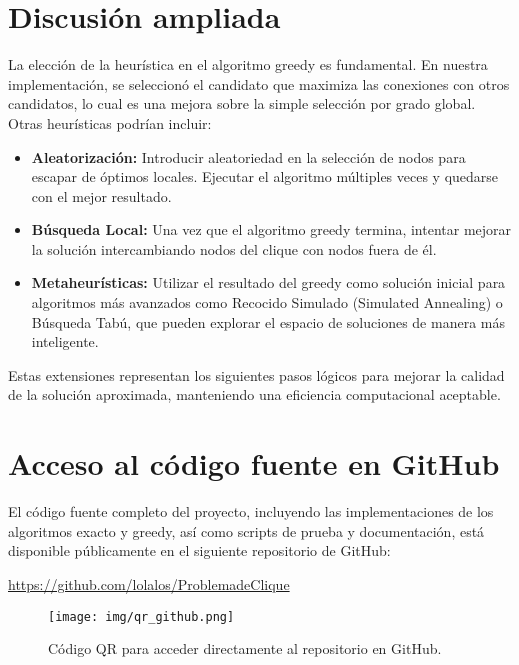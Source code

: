 \documentclass[12pt,a4paper]{report}
\begin{document}
\section{Discusión ampliada}
La elección de la heurística en el algoritmo greedy es fundamental. En nuestra implementación, se seleccionó el candidato que maximiza las conexiones con otros candidatos, lo cual es una mejora sobre la simple selección por grado global. Otras heurísticas podrían incluir:
\begin{itemize}
    \item \textbf{Aleatorización:} Introducir aleatoriedad en la selección de nodos para escapar de óptimos locales. Ejecutar el algoritmo múltiples veces y quedarse con el mejor resultado.
    \item \textbf{Búsqueda Local:} Una vez que el algoritmo greedy termina, intentar mejorar la solución intercambiando nodos del clique con nodos fuera de él.
    \item \textbf{Metaheurísticas:} Utilizar el resultado del greedy como solución inicial para algoritmos más avanzados como Recocido Simulado (Simulated Annealing) o Búsqueda Tabú, que pueden explorar el espacio de soluciones de manera más inteligente.
\end{itemize}
Estas extensiones representan los siguientes pasos lógicos para mejorar la calidad de la solución aproximada, manteniendo una eficiencia computacional aceptable.
\section{Acceso al código fuente en GitHub}

El código fuente completo del proyecto, incluyendo las implementaciones de los algoritmos exacto y greedy, así como scripts de prueba y documentación, está disponible públicamente en el siguiente repositorio de GitHub:

\begin{center}
\url{https://github.com/lolalos/ProblemadeClique}
\end{center}

\begin{figure}[H]
    \centering
    \texttt{[image: img/qr\_github.png]}
    \caption{Código QR para acceder directamente al repositorio en GitHub.}
    \label{fig:qr_github}
\end{figure}
\end{document}
